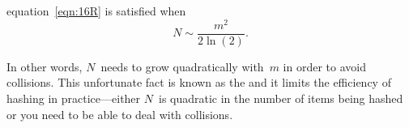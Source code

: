 equation~\eqref{eqn:16R} is satisfied when
\begin{equation}\label{eqn:16S}
    N \sim \frac{m^2}{2 \ln(2)}.
\end{equation}

In other words, $N$~needs to grow quadratically with~$m$ in order to
avoid collisions.  This unfortunate fact is known as the
 and it limits the efficiency of hashing in
practice---either $N$~is quadratic in the number of items being hashed
or you need to be able to deal with collisions.

\fi

\endinput
